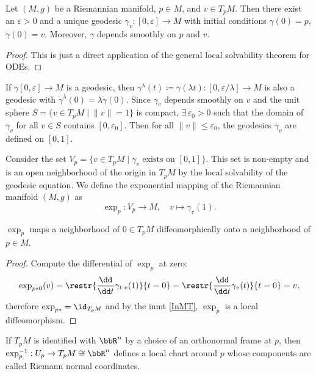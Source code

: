 \begin{lem}
    Let $(M,g)$ be a Riemannian manifold, $p\in M$, and $v\in T_p M$. Then there exist an $\varepsilon>0$ and a unique geodesic $\gamma_v:[0,\varepsilon]\to M$ with initial conditions $\gamma(0)=p$, $\dot\gamma(0)=v$. Moreover, $\gamma $ depends smoothly on $p$ and $v$.
\end{lem}
\begin{proof}
    This is just a direct application of the general local solvability theorem for ODEs.
\end{proof}
\begin{cor}
    If $\gamma[0,\varepsilon]\to M$ is a geodesic, then $\gamma^\lambda(t)\coloneqq \gamma(\lambda t):[0,\varepsilon/\lambda]\to M$ is also a geodesic with $\dot\gamma^\lambda(0)=\lambda\dot\gamma(0)$. Since $\gamma_v$ depends smoothly on $v$ and the unit sphere $S=\{v\in T_pM\mid \lVert v\rVert=1\}$ is compact, $\exists\,\varepsilon_0>0$ such that the domain of $\gamma_v$ for all $v\in S$ contains $[0,\varepsilon_0]$. Then for all $\lVert v\rVert\leq \varepsilon_0$, the geodesics $\gamma_v$ are defined on $[0,1]$.
\end{cor}
\begin{defn}
    Consider the set $V_p=\{v\in T_p M\mid \gamma_v \text{ exists on }[0,1]\}$. This set is non-empty and is an open neighborhood of the origin in $T_p M$ by the local solvability of the geodesic equation. We define the exponential mapping of the Riemannian manifold $(M,g)$ as
    \[\exp_p :V_p\to M,\quad v\mapsto \gamma_v(1).\]
\end{defn}

\begin{thm}
    $\exp_p$ maps a neighborhood of $0\in T_pM$ diffeomorphically onto a neighborhood of $p\in M$.
\end{thm}
\begin{proof}
    Compute the differential of $\exp_p$ at zero:
    \[\exp_{p\ast0}(v)=\restr{\frac{\dd}{\dd t}\gamma_{t\cdot v}(1)}{t=0}=\restr{\frac{\dd}{\dd t}\gamma_{v}(t)}{t=0}=v,\]
    therefore $\exp_{p\ast}=\id_{T_p M}$ and by the \gls{inmt} \ref{InMT}, $\exp_p$ is a local diffeomorphism.
\end{proof}

\begin{defn}
    If $T_p M$ is identified with $\bbR^n$ by a choice of an orthonormal frame at $p$, then $\exp_p^{-1}:U_p\to T_p M\cong\bbR^n$ defines a local chart around $p$ whose components are called Riemann normal coordinates.
\end{defn}

